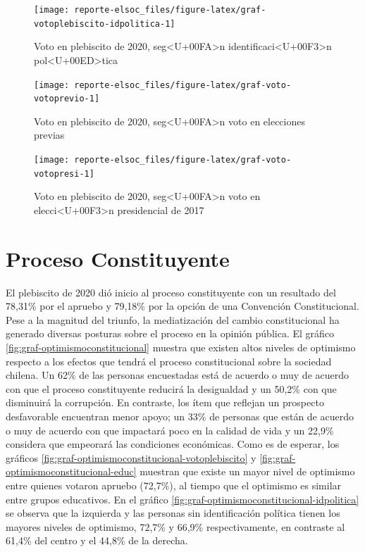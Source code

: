 \documentclass[
  12pt,
]{book}
\begin{document}
\begin{figure}

{\centering \texttt{[image: reporte-elsoc\_files/figure-latex/graf-votoplebiscito-idpolitica-1]} 

}

\caption{Voto en plebiscito de 2020, seg<U+00FA>n identificaci<U+00F3>n pol<U+00ED>tica}\label{fig:graf-votoplebiscito-idpolitica}
\end{figure}

\begin{figure}

{\centering \texttt{[image: reporte-elsoc\_files/figure-latex/graf-voto-votoprevio-1]} 

}

\caption{Voto en plebiscito de 2020, seg<U+00FA>n voto en elecciones previas}\label{fig:graf-voto-votoprevio}
\end{figure}

\begin{figure}

{\centering \texttt{[image: reporte-elsoc\_files/figure-latex/graf-voto-votopresi-1]} 

}

\caption{Voto en plebiscito de 2020, seg<U+00FA>n voto en elecci<U+00F3>n presidencial de 2017}\label{fig:graf-voto-votopresi}
\end{figure}

\hypertarget{proceso-constituyente}{%
\section{Proceso Constituyente}\label{proceso-constituyente}}

El plebiscito de 2020 dió inicio al proceso constituyente con un resultado del 78,31\% por el apruebo y 79,18\% por la opción de una Convención Constitucional. Pese a la magnitud del triunfo, la mediatización del cambio constitucional ha generado diversas posturas sobre el proceso en la opinión pública. El gráfico \ref{fig:graf-optimismoconstitucional} muestra que existen altos niveles de optimismo respecto a los efectos que tendrá el proceso constitucional sobre la sociedad chilena. Un 62\% de las personas encuestadas está de acuerdo o muy de acuerdo con que el proceso constituyente reducirá la desigualdad y un 50,2\% con que disminuirá la corrupción. En contraste, los ítem que reflejan un prospecto desfavorable encuentran menor apoyo; un 33\% de personas que están de acuerdo o muy de acuerdo con que impactará poco en la calidad de vida y un 22,9\% considera que empeorará las condiciones económicas. Como es de esperar, los gráficos \ref{fig:graf-optimismoconstitucional-votoplebiscito} y \ref{fig:graf-optimismoconstitucional-educ} muestran que existe un mayor nivel de optimismo entre quienes votaron apruebo (72,7\%), al tiempo que el optimismo es similar entre grupos educativos. En el gráfico \ref{fig:graf-optimismoconstitucional-idpolitica} se observa que la izquierda y las personas sin identificación política tienen los mayores niveles de optimismo, 72,7\% y 66,9\% respectivamente, en contraste al 61,4\% del centro y el 44,8\% de la derecha.
\end{document}
